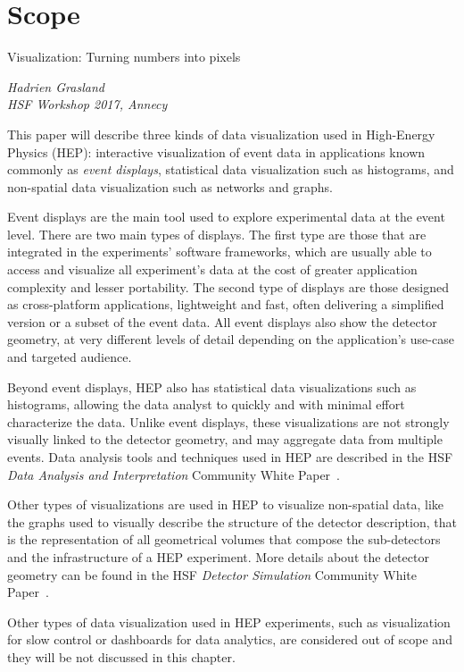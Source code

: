 \documentclass[12pt,a4paper]{article}
\begin{document}
\newpage


\hypertarget{scope}{%
\section{Scope}\label{scope}}

\epigraph{Visualization: Turning numbers into pixels}{\textit{Hadrien Grasland \\ HSF Workshop 2017, Annecy}}

This paper will describe three kinds of data visualization used in High-Energy Physics (HEP): interactive visualization
of event data in applications known commonly as \emph{event displays}, statistical data visualization such as
histograms, and non-spatial data visualization such as networks and graphs.

Event displays are the main tool used to explore experimental data at the event level.
There are two main types of displays. The first type are those that are integrated in the experiments’ software frameworks,
which are usually able to access and visualize all experiment’s data at the cost of greater application complexity and lesser portability.
The second type of displays are those designed as cross-platform applications, lightweight and fast, often
delivering a simplified version or a subset of the event data. All event displays also show the detector geometry, at very different levels of detail depending on the application's use-case and targeted audience.

Beyond event displays, HEP also has statistical data visualizations such as histograms, allowing the data analyst to quickly
and with minimal effort characterize the data.
Unlike event displays, these visualizations are not strongly visually linked to the detector geometry,
and may aggregate data from multiple events. Data analysis tools and techniques used in HEP are
described in the HSF \textit{Data Analysis and Interpretation} Community White Paper~\cite{HSF-CWP-2017-05}.

Other types of visualizations are used in HEP to
visualize non-spatial data, like the graphs used to visually describe the structure of the detector description, that is 
the representation of all geometrical volumes that compose the sub-detectors and the infrastructure of a HEP experiment.
More details about the detector geometry can be found in the HSF \textit{Detector Simulation} Community White Paper~\cite{HSF-CWP-2017-07}.

Other types of data visualization used in HEP experiments, such as visualization for slow control
or dashboards for data analytics, are considered out of scope and they will be not discussed in this chapter.
\end{document}
